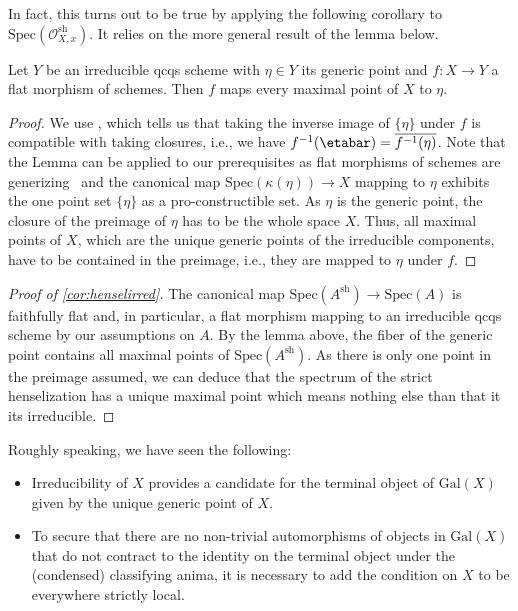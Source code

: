 \documentclass[leqno]{article}
\renewcommand{\Gal}{\mathrm{Gal}}
\renewcommand{\Spec}{\mathrm{Spec}}
\begin{document}
In fact, this turns out to be true by applying the following corollary to $\Spec(\mathcal{O}_{X,x}^{\mathrm{sh}})$.
It relies on the more general result of the lemma below.
%
\begin{lemma}
Let $Y$ be an irreducible qcqs scheme with $\eta \in Y$ its generic point and $f\colon X\rightarrow Y$ a flat morphism of schemes. 
Then $f$ maps every maximal point of $X$ to $\eta$.
\end{lemma}
\begin{proof}
We use \cite[Lemma 14.42]{AG1}, which tells us that taking the inverse image of $\{\eta\}$ under $f$ is compatible with taking closures, i.e., we have
$f^{-1}(\etabar)=\overline{f^{-1}(\eta)} $.
Note that the Lemma can be applied to our prerequisites as flat morphisms of schemes are generizing~\cite[Lemma~14.9]{AG1} and the canonical map $\Spec(\kappa(\eta))\rightarrow X$ mapping to $\eta$ exhibits the one point set $\{\eta\}$ as a pro-constructible set.
As $\eta$ is the generic point, the closure of the preimage of $\eta$ has to be the whole space $X$.
Thus, all maximal points of $X$, which are the unique generic points of the irreducible components, have to be contained in the preimage, i.e., they are mapped to $\eta$ under $f$. 
\end{proof}
\begin{proof}[Proof of \cref{cor:henselirred}]
The canonical map $\Spec(A^{\mathrm{sh}}) \rightarrow \Spec(A)$ is faithfully flat and, in particular, a flat morphism mapping to an irreducible qcqs scheme by our assumptions on $A$.
By the lemma above, the fiber of the generic point contains all maximal points of $\Spec(A^{\mathrm{sh}})$.
As there is only one point in the preimage assumed, we can deduce that the spectrum of the strict henselization has a unique maximal point which means nothing else than that it its irreducible.
\end{proof}
Roughly speaking, we have seen the following: 
\begin{itemize}
    \item[1.] Irreducibility of $X$ provides a candidate for the terminal object of $\Gal(X)$ given by the unique generic point of $X$.
    \item[2.] To secure that there are no non-trivial automorphisms of objects in $\Gal(X)$ that do not contract to the identity on the terminal object under the (condensed) classifying anima, it is necessary to add the condition on $X$ to be everywhere strictly local.
\end{itemize}
\end{document}
